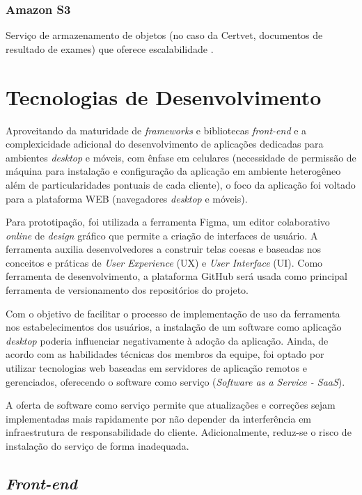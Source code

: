 \documentclass[
    12pt,               %
    openright,          %
    oneside,
    a4paper,            %
    BIBLATEX,           %
    TODO,               %
    english,            %
    brazil              %
    ]{ifsp-spo-inf-ctds}
\begin{document}
        \subsubsection{Amazon S3}

            Serviço de armazenamento de objetos (no caso da Certvet, documentos de resultado de exames) que oferece escalabilidade . 

    \section{Tecnologias de Desenvolvimento}

        Aproveitando da maturidade de \emph{frameworks} e bibliotecas \emph{front-end} e a complexicidade adicional do desenvolvimento de aplicações dedicadas para ambientes \emph{desktop} e móveis, com ênfase em celulares (necessidade de permissão de máquina para instalação e configuração da aplicação em ambiente heterogêneo além de particularidades pontuais de cada cliente), o foco da aplicação foi voltado para a plataforma WEB (navegadores \emph{desktop} e móveis).

        Para prototipação, foi utilizada a ferramenta Figma, um editor colaborativo \emph{online} de \emph{design} gráfico que permite a criação de interfaces de usuário. A ferramenta auxilia desenvolvedores a construir telas coesas e baseadas nos conceitos e práticas de \emph{User Experience} (UX) e \emph{User Interface }(UI). Como ferramenta de desenvolvimento, a plataforma GitHub será usada como principal ferramenta de versionamento dos  repositórios do projeto.

        Com o objetivo de facilitar o processo de implementação de uso da ferramenta nos estabelecimentos dos usuários, a instalação de um software como aplicação \emph{desktop} poderia influenciar negativamente à adoção da aplicação. Ainda, de acordo com as habilidades técnicas dos membros da equipe, foi optado por utilizar tecnologias web baseadas em servidores de aplicação remotos e gerenciados, oferecendo o software como serviço (\emph{Software as a Service - SaaS}).

        A oferta de software como serviço permite que atualizações e correções sejam implementadas mais rapidamente por não depender da interferência em infraestrutura de responsabilidade do cliente. Adicionalmente, reduz-se o risco de instalação do serviço de forma inadequada.

    \subsection{\emph{Front-end}}
\end{document}
